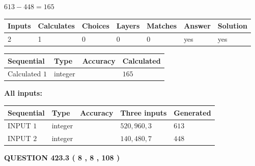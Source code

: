 \documentclass{ctexart}
\begin{document}
 

$ %
613 -  %
448=   %
165$
 
 
\noindent{}
 
 

 
   
   
   
   
\noindent\begin{tabular}{|l|l|l|l|l|l|l|}
 \hline
Inputs & Calculates & Choices & Layers & Matches & Answer & Solution \\ \hline
 2  & 
 1  & 
 0
  & 
 0  & 
 0  & 
  yes & 
  yes 
  \\ \hline
 \end{tabular}
   
   
   
   
\noindent{}
   
   
  
  
\noindent\begin{tabular}{|l|l|l|l|}
\hline
 Sequential & Type & Accuracy & Calculated \\ 
\hline
 
 
  Calculated $  1 $ & integer &  & 
  $ 165 $ 
 \\  \hline  
 \end{tabular}
   
   
   
   
\noindent\vspace{0.1in}\hspace{-0.08in} {\textbf{\Large{All inputs: }}}
   
   
  
  
\noindent\begin{tabular}{|l|l|l|l|l|}
\hline
 Sequential & Type & Accuracy & Three inputs & Generated \\ 
\hline
 
 
  INPUT $  1 $ & integer &  & $
 520
 , 
 960
 , 
 3
 $ & $ 613 $ 
 \\  \hline  
 
 
  INPUT $  2 $ & integer &  & $
 140
 , 
 480
 , 
 7
 $ & $ 448 $ 
 \\  \hline  
 \end{tabular}
   
   
  
\vspace{0.2in}
  
{\textbf{\Large{QUESTION
423.3 
 ( 8 , 8 , 108 )
}}}
  
\end{document}
